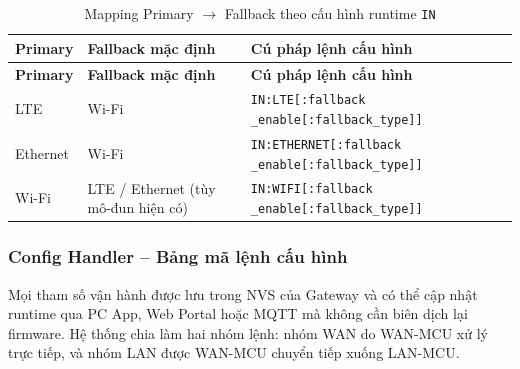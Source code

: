                \begin{longtable}{|p{3cm}|p{4.5cm}|p{7cm}|}
                    \caption{Mapping Primary $\to$ Fallback theo cấu hình runtime \texttt{IN}}
                    \label{tab:internet_fallback} \\
                    \hline
                    \textbf{Primary} & \textbf{Fallback mặc định} & \textbf{Cú pháp lệnh cấu hình} \\ \hline
                    \endfirsthead
                    \hline
                    \textbf{Primary} & \textbf{Fallback mặc định} & \textbf{Cú pháp lệnh cấu hình} \\ \hline
                    \endhead
                    LTE & Wi-Fi & \texttt{IN:LTE[:fallback \newline \_enable[:fallback\_type]]} \\ \hline
                    Ethernet & Wi-Fi & \texttt{IN:ETHERNET[:fallback \newline \_enable[:fallback\_type]]} \\ \hline
                    Wi-Fi & LTE / Ethernet (tùy mô-đun hiện có) & \texttt{IN:WIFI[:fallback \newline \_enable[:fallback\_type]]} \\ \hline
                \end{longtable}
        
        \subsubsection{Config Handler -- Bảng mã lệnh cấu hình}
        
            Mọi tham số vận hành được lưu trong NVS của Gateway và có thể cập nhật runtime qua PC App, Web Portal hoặc MQTT mà không cần biên dịch lại firmware. Hệ thống chia làm hai nhóm lệnh: nhóm WAN do WAN-MCU xử lý trực tiếp, và nhóm LAN được WAN-MCU chuyển tiếp xuống LAN-MCU.
            
